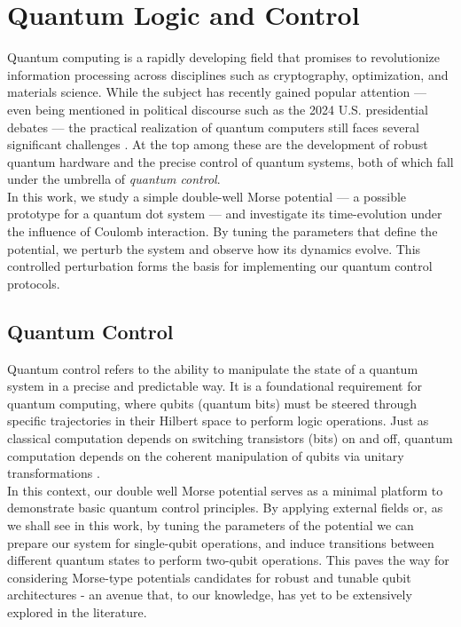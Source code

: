 \documentclass{subfiles}
\begin{document}
\section{Quantum Logic and Control}
Quantum computing is a rapidly developing field that promises to revolutionize information processing across disciplines such as cryptography, optimization, and materials science. While the subject has recently gained popular attention — even being mentioned in political discourse such as the 2024 U.S. presidential debates — the practical realization of quantum computers still faces several significant challenges \cite{lau2022nisq}. At the top among these are the development of robust quantum hardware and the precise control of quantum systems, both of which fall under the umbrella of \emph{quantum control}\cite{huang1983controllability, d2021introduction}. \\ 

In this work, we study a simple double-well Morse potential — a possible prototype for a quantum dot system — and investigate its time-evolution under the influence of Coulomb interaction. By tuning the parameters that define the potential, we perturb the system and observe how its dynamics evolve. This controlled perturbation forms the basis for implementing our quantum control protocols.
\subsection{Quantum Control}
Quantum control refers to the ability to manipulate the state of a quantum system in a precise and predictable way. It is a foundational requirement for quantum computing, where qubits (quantum bits) must be steered through specific trajectories in their Hilbert space to perform logic operations. Just as classical computation depends on switching transistors (bits) on and off, quantum computation depends on the coherent manipulation of qubits via unitary transformations \cite{nielsen2010quantum}. \\ 
In this context, our double well Morse potential serves as a minimal platform to demonstrate basic quantum control principles. By applying external fields or, as we shall see in this work, by tuning the parameters of the potential we can prepare our system for single-qubit operations, and induce transitions between different quantum states to perform two-qubit operations. This paves the way for considering Morse-type potentials candidates for robust and tunable qubit architectures - an avenue that, to our knowledge, has yet to be extensively explored in the literature.
\end{document}
